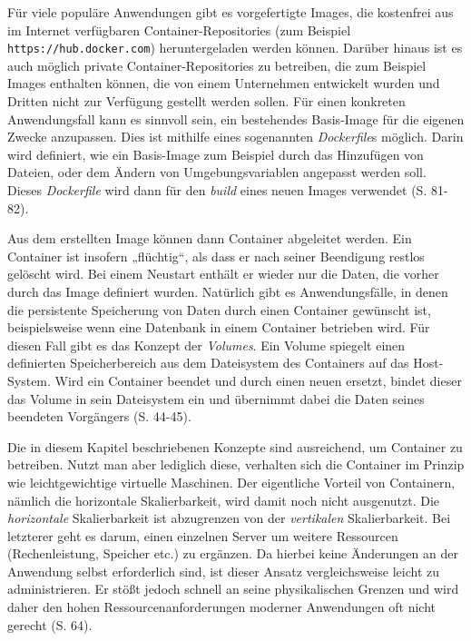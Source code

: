 \documentclass[11pt,a4paper]{article}
\begin{document}
Für viele populäre Anwendungen gibt es vorgefertigte Images, die kostenfrei aus im Internet verfügbaren
Container-Repositories (zum Beispiel \lstinline|https://hub.docker.com|) heruntergeladen werden können.
Darüber hinaus ist es auch möglich private Container-Repositories zu betreiben,
die zum Beispiel Images enthalten können, die von einem Unternehmen entwickelt wurden
und Dritten nicht zur Verfügung gestellt werden sollen.
Für einen konkreten Anwendungsfall kann es sinnvoll sein, ein bestehendes Basis-Image für die eigenen Zwecke anzupassen.
Dies ist mithilfe eines sogenannten \emph{Dockerfile}s möglich. Darin wird definiert, wie ein Basis-Image
zum Beispiel durch das Hinzufügen von Dateien,
oder dem Ändern von Umgebungsvariablen angepasst werden soll. Dieses \emph{Dockerfile} wird dann für den \emph{build}
eines neuen Images verwendet \cite{kofler2021docker} (S. 81-82).

Aus dem erstellten Image können dann Container abgeleitet werden. Ein Container ist insofern „flüchtig“, als dass er nach seiner
Beendigung restlos gelöscht wird. Bei einem Neustart enthält er wieder nur die Daten, die vorher durch das Image definiert wurden.
Natürlich gibt es Anwendungsfälle, in denen die persistente Speicherung von Daten durch einen Container gewünscht ist,
beispielsweise wenn
eine Datenbank in einem Container betrieben wird. Für diesen Fall gibt es das Konzept der \emph{Volumes}.
Ein Volume spiegelt einen definierten Speicherbereich aus dem Dateisystem des Containers auf das Host-System.
Wird ein Container beendet und durch einen neuen ersetzt, bindet dieser das Volume in sein Dateisystem ein und übernimmt
dabei die Daten seines beendeten Vorgängers \cite{kofler2021docker} (S. 44-45).

Die in diesem Kapitel beschriebenen Konzepte sind ausreichend, um Container zu betreiben.
Nutzt man aber lediglich diese, verhalten sich die Container im Prinzip wie leichtgewichtige virtuelle Maschinen.
Der eigentliche Vorteil von Containern, nämlich die horizontale Skalierbarkeit, wird damit noch nicht ausgenutzt.
Die \emph{horizontale} Skalierbarkeit ist abzugrenzen von der \emph{vertikalen} Skalierbarkeit.
Bei letzterer geht es darum, einen einzelnen Server um weitere Ressourcen (Rechenleistung, Speicher etc.) zu ergänzen.
Da hierbei keine Änderungen an der Anwendung selbst erforderlich sind, ist dieser Ansatz vergleichsweise leicht
zu administrieren. Er stößt jedoch schnell an seine physikalischen Grenzen und wird daher den hohen
Ressourcenanforderungen moderner Anwendungen oft nicht gerecht \cite{Schmeling_Dargatz_2022} (S. 64).
\end{document}
